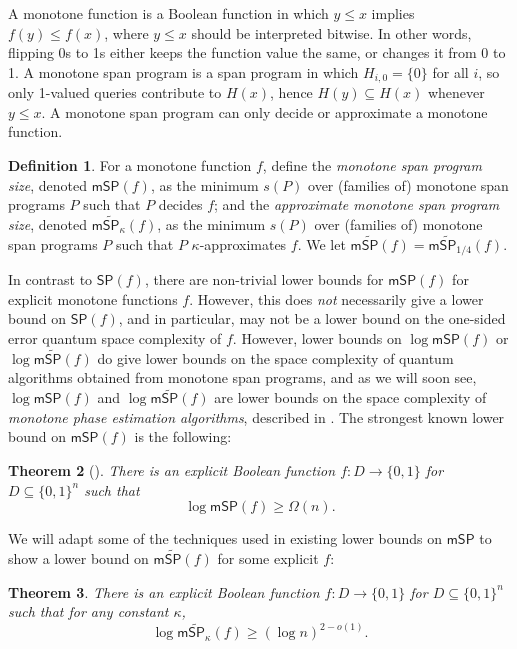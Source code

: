 \documentclass[11pt]{article}
\numberwithin{equation}{section}
\newtheorem{theorem}{Theorem}[section]
\theoremstyle{definition}
\newtheorem{definition}[theorem]{Definition}
\theoremstyle{plain}
\begin{document}
A monotone function is a Boolean function in which $y\leq x$ implies $f(y)\leq f(x)$, where $y\leq x$ should be interpreted bitwise. In other words, flipping 0s to 1s either keeps the function value the same, or changes it from 0 to 1. 
A monotone span program is a span program in which $H_{i,0}=\{0\}$ for all $i$, so only 1-valued queries contribute to $H(x)$, hence $H(y)\subseteq H(x)$ whenever $y\leq x$. A monotone span program can only decide or approximate a monotone function. 

\begin{definition}\label{def:monotoneSP}
For a monotone function $f$, define the \emph{monotone span program size}, denoted $\mathsf{mSP}(f)$, as the minimum $s(P)$ over (families of) monotone span programs $P$ such that $P$ decides $f$; and the \emph{approximate monotone span program size}, denoted $\mathsf{m}\widetilde{\mathsf{SP}}_\kappa(f)$, as the minimum $s(P)$ over (families of) monotone span programs $P$ such that $P$ $\kappa$-approximates $f$. We let $\mathsf{m}\widetilde{\mathsf{SP}}(f)=\mathsf{m}\widetilde{\mathsf{SP}}_{1/4}(f)$.
\end{definition}

In contrast to $\mathsf{SP}(f)$, there are non-trivial lower bounds for $\mathsf{mSP}(f)$ for explicit monotone functions $f$. However, this does \emph{not} necessarily give a lower bound on $\mathsf{SP}(f)$, and in particular, may not be a lower bound on the one-sided error quantum space complexity of $f$. However, lower bounds on $\log\mathsf{mSP}(f)$ or $\log\mathsf{m}\widetilde{\mathsf{SP}}(f)$ do give lower bounds on the space complexity of quantum algorithms obtained from monotone span programs, and as we will soon see, $\log\mathsf{mSP}(f)$ and $\log\mathsf{m}\widetilde{\mathsf{SP}}(f)$ are lower bounds on the space complexity of \emph{monotone phase estimation algorithms}, described in .
The strongest known lower bound on $\mathsf{mSP}(f)$ is the following:
\begin{theorem}[\cite{PR17}]\label{thm:PR}
There is an explicit Boolean function $f:D\rightarrow\{0,1\}$ for $D\subseteq\{0,1\}^n$ such that
$$\log\mathsf{mSP}(f)\geq \Omega(n).$$
\end{theorem}

We will adapt some of the techniques used in existing lower bounds on $\mathsf{mSP}$ to show a lower bound on $\mathsf{m}\widetilde{\mathsf{SP}}(f)$ for some explicit $f$:


\begin{theorem}\label{thm:explicit}
There is an explicit Boolean function $f:D\rightarrow\{0,1\}$ for $D\subseteq \{0,1\}^n$ such that for any constant $\kappa$,
$$\log\mathsf{m}\widetilde{\mathsf{SP}}_{\kappa}(f)\geq (\log n)^{2-o(1)}.$$
\end{theorem}
\end{document}

